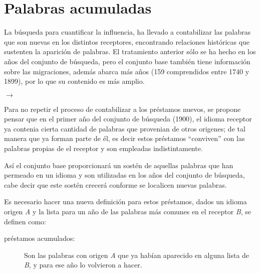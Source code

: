 \chapter{Palabras acumuladas}

La búsqueda para cuantificar la influencia, ha llevado a contabilizar las
palabras que son nuevas en los distintos receptores, encontrando relaciones históricas que sustenten la aparición de palabras.  El tratamiento anterior sólo se ha hecho en los años del conjunto de búsqueda, pero  el conjunto base  también tiene información sobre las migraciones, además  abarca más años (159 comprendidos entre 1740 y 1899), por lo que su contenido es más amplio. 


$\rightarrow$ 


Para no repetir el proceso de contabilizar a los préstamos nuevos,  se propone pensar que en el primer año del conjunto de búsqueda (1900), el idioma receptor ya contenia  cierta cantidad de palabras que provenian de otros origenes; 
de tal manera que  ya forman parte de él, es decir estos préstamos ``conviven'' con las palabras propias de el receptor y son empleadas
indistintamente.


Así el conjunto base proporcionará un sostén de aquellas palabras que han permeado en un idioma
y son utilizadas en los años del conjunto de búsqueda,  cabe decir que este
sostén crecerá conforme se localicen nuevas palabras. 

Es necesario hacer una nueva definición para estos préstamos, dados un idioma  origen  \textit{A} y la lista para un año  de las palabras más comunes en el receptor \textit{B}, se definen como: 

\begin{description}
	\item[préstamos acumulados:] Son las palabras con origen \textit{A} que ya habían aparecido en alguna lista de \textit{B}, y para ese año lo volvieron a hacer.  
\end{description}

